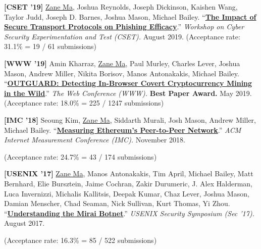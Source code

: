 \documentclass[10pt,singlecolumn]{article} %
\begin{document}
\begin{etaremune}

\item \textbf{[CSET '19]}
\underline{Zane Ma}, Joshua Reynolds, Joseph Dickinson, Kaishen Wang, Taylor Judd, Joseph D. Barnes, Joshua Mason, Michael Bailey.
``\textbf{\href{https://zanema.com/papers/cset19_httpsphishing.pdf}{The Impact of Secure Transport Protocols on Phishing Efficacy}}.''
\emph{Workshop on Cyber Security Experimentation and Test (CSET).} August 2019.
(Acceptance rate: 31.1\% = 19 / 61 submissions)
\vspace{6pt}


\item  \textbf{[WWW '19]}
Amin Kharraz, \underline{Zane Ma}, Paul Murley, Charles Lever, Joshua Mason, Andrew Miller, Nikita Borisov, Manos Antonakakis, Michael Bailey. 
``\textbf{\href{https://zanema.com/papers/www19_cryptojacking.pdf}{OUTGUARD: Detecting In-Browser Covert Cryptocurrency Mining in the Wild}}.''
\emph{The Web Conference (WWW).} \textbf{\color{headings}Best Paper Award.} May 2019.
(Acceptance rate: 18.0\% = 225 / 1247 submissions)
\vspace{6pt}


\item \textbf{[IMC '18]}
Seoung Kim, \underline{Zane Ma}, Siddarth Murali, Josh Mason, Andrew Miller, Michael Bailey.
``\textbf{\href{https://zanema.com/papers/imc18_ethpeers.pdf}{Measuring Ethereum's Peer-to-Peer Network}}.''
\emph{ACM Internet Measurement Conference (IMC).} November 2018.

(Acceptance rate: 24.7\% = 43 / 174 submissions)
\vspace{6pt}


\item \textbf{[USENIX '17]}
\underline{Zane Ma}, Manos Antonakakis, Tim April, Michael Bailey, Matt Bernhard, Elie Bursztein, Jaime Cochran, Zakir Durumeric, J. Alex Halderman, Luca Invernizzi, Michalis Kallitsis, Deepak Kumar, Chaz Lever, Joshua Mason, Damian Menscher, Chad Seaman, Nick Sullivan, Kurt Thomas, Yi Zhou.
``\textbf{\href{https://zanema.com/papers/usenix17_mirai.pdf}{Understanding the Mirai Botnet}}.''
\emph{USENIX Security Symposium (Sec '17).} August 2017.

(Acceptance rate: 16.3\% = 85 / 522 submissions)
\vspace{6pt}


\end{etaremune}
\end{document}
